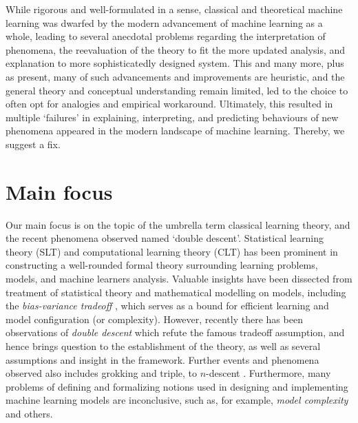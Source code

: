 \documentclass[10pt,oneside,oldfontcommands,dvipsnames,article]{memoir}
\begin{document}
While rigorous and well-formulated in a sense, classical and theoretical machine learning was dwarfed by the modern advancement of machine learning as a whole, leading to several anecdotal problems regarding the interpretation of phenomena, the reevaluation of the theory to fit the more updated analysis, and explanation to more sophisticatedly designed system. This and many more, plus as present, many of such advancements and improvements are heuristic, and the general theory and conceptual understanding remain limited, led to the choice to often opt for analogies and empirical workaround. Ultimately, this resulted in multiple `failures' in explaining, interpreting, and predicting behaviours of new phenomena appeared in the modern landscape of machine learning. Thereby, we suggest a fix. 

\section{Main focus}

Our main focus is on the topic of the umbrella term classical learning theory, and the recent phenomena observed named `double descent'. Statistical learning theory (SLT) and computational learning theory (CLT) \cite{Vapnik1999-VAPTNO,10.5555/2371238,10.5555/2621980,STL_Hajek_Maxim_2021,bousquet2020theoryuniversallearning} has been prominent in constructing a well-rounded formal theory surrounding learning problems, models, and machine learners analysis. Valuable insights have been dissected from treatment of statistical theory and mathematical modelling on models, including the \textit{bias-variance tradeoff} \cite{6797087,Domingos2000AUB}, which serves as a bound for efficient learning and model configuration (or complexity). However, recently there has been observations of \textit{double descent} \cite{belkin_reconciling_2019,schaeffer_double_2023,nakkiran_deep_2019,lafon_understanding_2024} which refute the famous tradeoff assumption, and hence brings question to the establishment of the theory, as well as several assumptions and insight in the framework. Further events and phenomena observed also includes grokking and triple, to $n$-descent \cite{davies_unifying_2023,d_ascoli_triple_2020}. Furthermore, many problems of defining and formalizing notions used in designing and implementing machine learning models are inconclusive, such as, for example, \textit{model complexity} and others. 
\end{document}
